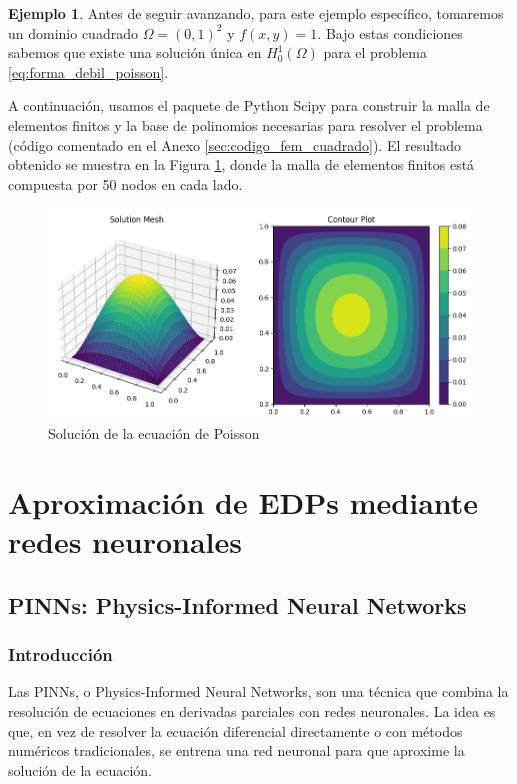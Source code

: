 \documentclass[a4paper,11pt,spanish, twoside, leqno]{tfg-uam}
\theoremstyle{definition}
\newtheorem{exmp}[teor]{Ejemplo}
\begin{document}
\begin{mdframed}
\begin{exmp}
    Antes de seguir avanzando, para este ejemplo específico, tomaremos un dominio cuadrado $\Omega = (0,1)^2$ y $f(x, y) = 1$. Bajo estas condiciones sabemos que existe una solución única en $H_0^1(\Omega)$ para el problema \eqref{eq:forma_debil_poisson}.

    A continuación, usamos el paquete de Python Scipy para construir la malla de elementos finitos y la base de polinomios necesarias para resolver el problema (código comentado en el Anexo \ref{sec:codigo_fem_cuadrado}). El resultado obtenido se muestra en la Figura \ref{fig:poisson}, donde la malla de elementos finitos está compuesta por 50 nodos en cada lado.
    \begin{figure}[H] 
        \centering
        \includegraphics[width=1\textwidth]{Figuras/FEMSquare.png}
        \caption{Solución de la ecuación de Poisson}
        \label{fig:poisson}
    \end{figure}
\end{exmp}
\end{mdframed}

\chapter{Aproximación de EDPs mediante redes neuronales}\label{chap2}

\section{PINNs: Physics-Informed Neural Networks}\label{sec:PINN}
\subsection{Introducción}
Las PINNs, o Physics-Informed Neural Networks, son una técnica que combina la resolución de ecuaciones en derivadas parciales con redes neuronales. La idea es que, en vez de resolver la ecuación diferencial directamente o con métodos numéricos tradicionales, se entrena una red neuronal para que aproxime la solución de la ecuación. 
\end{document}
